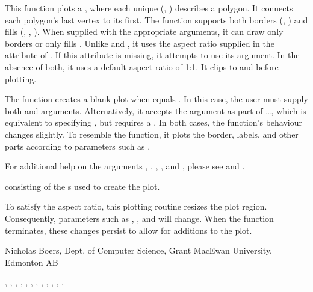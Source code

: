 \documentclass[letterpaper]{book}
\begin{document}
\begin{Details}\relax
This function plots a , where each unique (,
) describes a polygon.  It connects each polygon's last
vertex to its first.  The function supports both borders
(, ) and fills (, ,
).  When supplied with the appropriate arguments, it can
draw only borders or only fills .  Unlike  and
, it uses the aspect ratio supplied in the
 attribute of .  If this attribute is
missing, it attempts to use its  argument.  In the
absence of both, it uses a default aspect ratio of 1:1.  It clips
 to  and  before plotting.

The function creates a blank plot when  equals
.  In this case, the user must supply both  and
 arguments.  Alternatively, it accepts the argument
 as part of \dots, which is equivalent to specifying
, but requires a .  In both cases,
the function's behaviour changes slightly.  To resemble the
 function, it plots the border, labels, and other
parts according to  parameters such as .

For additional help on the arguments , ,
, , and , please see
 and .
\end{Details}
%
\begin{Value}
 consisting of the s used to create the plot.
\end{Value}
%
\begin{Note}\relax
To satisfy the aspect ratio, this plotting routine resizes the plot
region.  Consequently,  parameters such as
, , and  will change.  When the function
terminates, these changes persist to allow for additions to the plot.
\end{Note}
%
\begin{Author}\relax
Nicholas Boers, Dept. of Computer Science, Grant MacEwan University, Edmonton AB
\end{Author}
%
\begin{SeeAlso}\relax
{},
,
,
,
,
,
,
,
,
,
,
.
\end{SeeAlso}
\end{document}
